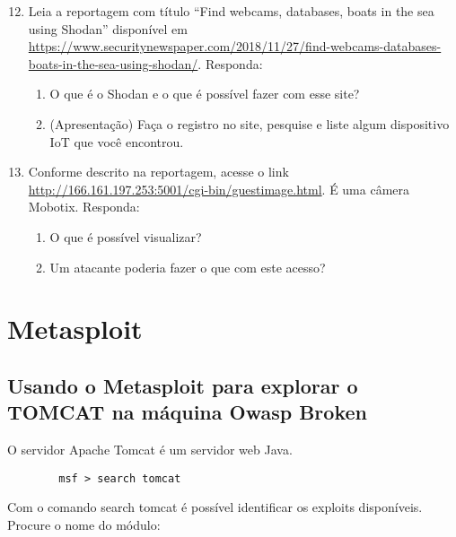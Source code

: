 \documentclass{article}
\begin{document}
    \begin{superframe}
        \begin{enumerate}
            \setcounter{enumi}{11}
            \item Leia a reportagem com título ``Find webcams, databases, boats
                in the sea using Shodan'' disponível em
                \url{https://www.securitynewspaper.com/2018/11/27/find-webcams-databases-boats-in-the-sea-using-shodan/}.
                Responda:

                \begin{enumerate}
                    \item O que é o Shodan e o que é possível fazer com esse
                        site?
                    \item (Apresentação) Faça o registro no site, pesquise e
                        liste algum dispositivo IoT que você encontrou.
                \end{enumerate}

        \item Conforme descrito na reportagem, acesse o link
            \url{http://166.161.197.253:5001/cgi-bin/guestimage.html}. É uma
            câmera Mobotix. Responda:
            \begin{enumerate}
                \item O que é possível visualizar?
                \item Um atacante poderia fazer o que com este acesso?
            \end{enumerate}
        \end{enumerate}
    \end{superframe}

    \section{Metasploit}

    \subsection{%
        Usando o Metasploit para explorar o TOMCAT na máquina Owasp Broken
    }

    O servidor Apache Tomcat é um servidor web Java.

    \begin{verbatim}
        msf > search tomcat
    \end{verbatim}

    Com o comando search tomcat é possível identificar os exploits disponíveis.
    Procure o nome do módulo:
\end{document}
